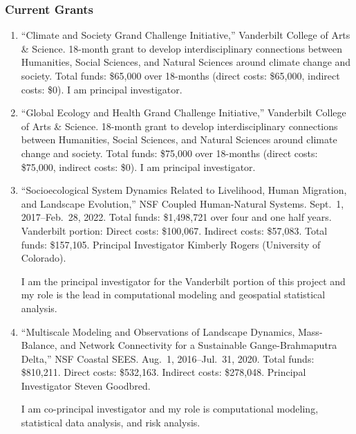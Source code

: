 %
%
\subsubsection{Current Grants}
\begin{enumerate}
    \item ``Climate and Society Grand Challenge Initiative,'' Vanderbilt College of Arts \& Science. 18-month grant to develop interdisciplinary connections between Humanities, Social Sciences, and Natural Sciences around climate change and society. Total funds: \$65,000 over 18-months (direct costs: \$65,000, indirect costs: \$0). I am principal investigator.
    \item ``Global Ecology and Health Grand Challenge Initiative,'' Vanderbilt College of Arts \& Science. 18-month grant to develop interdisciplinary connections between Humanities, Social Sciences, and Natural Sciences around climate change and society. Total funds: \$75,000 over 18-months (direct costs: \$75,000, indirect costs: \$0). I am principal investigator.
    \item ``Socioecological System Dynamics Related to Livelihood, Human Migration, and Landscape Evolution,'' NSF Coupled Human-Natural Systems. Sept.~1, 2017--Feb.~28, 2022. Total funds: \$1,498,721 over four and one half years. Vanderbilt portion: Direct costs: \$100,067. Indirect costs: \$57,083. Total funds: \$157,105. Principal Investigator Kimberly Rogers (University of Colorado).
    \begin{credit}
    	I am the principal investigator for the Vanderbilt portion of this project and my role is the lead in computational modeling and geospatial statistical analysis.
    \end{credit}
	\item ``Multiscale Modeling and Observations of Landscape Dynamics, Mass-Balance, and Network Connectivity for a Sustainable Gange-Brahmaputra Delta,'' NSF Coastal SEES. Aug.~1, 2016--Jul.~31, 2020. Total funds: \$810,211. Direct costs: \$532,163. Indirect costs: \$278,048. Principal Investigator Steven Goodbred.
	\begin{credit}
		I am co-principal investigator and my role is computational modeling, statistical data analysis, and risk analysis.
	\end{credit}
\end{enumerate}
%
\iffalse
\subsubsection{Pending Grant Proposals}
\begin{enumerate}
\end{enumerate}
\fi
%
